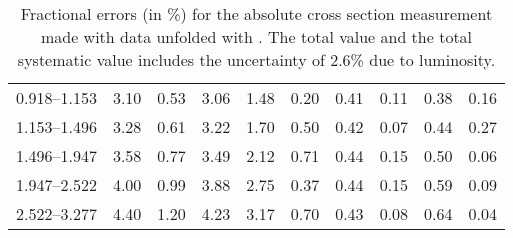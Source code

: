 \begin{table}
\begin{center}
\begin{tabular}{@{}l l l l l l l l l l@{}}
            0.918--1.153     &  3.10   &  0.53   &  3.06         &  1.48      &  0.20    &  0.41  &  0.11       &  0.38  &  0.16  \\
            1.153--1.496     &  3.28   &  0.61   &  3.22         &  1.70      &  0.50    &  0.42  &  0.07       &  0.44  &  0.27  \\
            1.496--1.947     &  3.58   &  0.77   &  3.49         &  2.12      &  0.71    &  0.44  &  0.15       &  0.50  &  0.06  \\
            1.947--2.522     &  4.00   &  0.99   &  3.88         &  2.75      &  0.37    &  0.44  &  0.15       &  0.59  &  0.09  \\
            2.522--3.277     &  4.40   &  1.20   &  4.23         &  3.17      &  0.70    &  0.43  &  0.08       &  0.64  &  0.04  \\
            \bottomrule
        \end{tabular}
    \end{center}
    \caption[
        Fractional errors for the absolute cross section measurement
        made with data unfolded with \POWHEG.
    ]{
        Fractional errors (in \%) for the absolute cross section measurement
        made with data unfolded with \POWHEG. The total value and the total
        systematic value includes the uncertainty of 2.6\% due to luminosity.
    }
    \label{tab:sys_uncert_abs_powheg}
\end{table}
